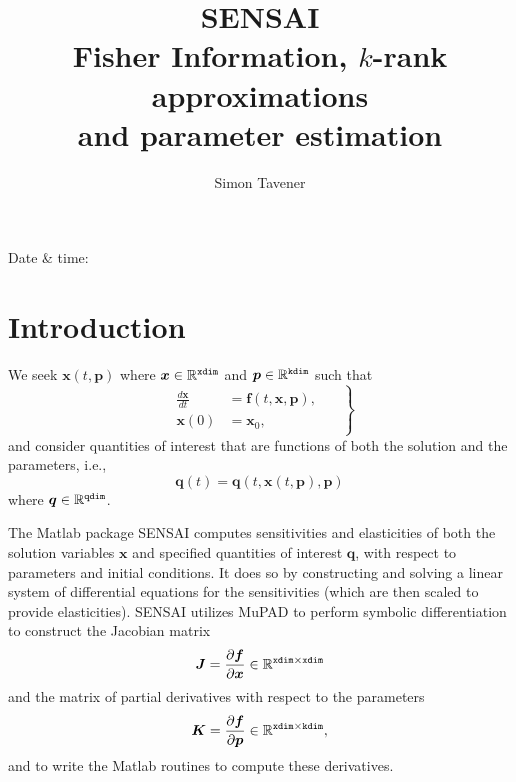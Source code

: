 \documentclass{siamltex}
\newcommand{\fvec}{\bm{f}}
\newcommand{\pvec}{\bm{p}}
\newcommand{\qvec}{\bm{q}}
\newcommand{\xvec}{\bm{x}}
\newcommand{\Jmat}{\bm{J}}
\newcommand{\Kmat}{\bm{K}}
\newcommand{\reals}{\mathbb R}
\newcommand{\xdim}{{\tt xdim}}
\newcommand{\kdim}{{\tt kdim}}
\newcommand{\qdim}{{\tt qdim}}
\begin{document}
\title{SENSAI \\  Fisher Information,  $k$-rank approximations \\ and parameter estimation}
\author{Simon Tavener}
\maketitle
\hfill Date \& time: \timestamp
\pagestyle{empty}


\section{Introduction}

We seek $\xvec(t,\pvec)$ where $\xvec \in \reals^\xdim$ and $\pvec \in \reals^\kdim$ such that
\begin{equation}
\left .
\begin{gathered}\begin{aligned}
\frac{d\xvec}{dt} &= \fvec(t,\xvec,\pvec), \\
         \xvec(0) &= \xvec_0,
\end{aligned}\end{gathered}
\quad\right\}
\end{equation}
and consider quantities of interest that are functions of both the solution and the parameters, i.e.,
\begin{equation}
\qvec(t)=\qvec(t,\xvec(t,\pvec),\pvec)
\end{equation}
where $\qvec \in \reals^\qdim$.


The Matlab package SENSAI computes sensitivities and elasticities of both the solution variables $\xvec$ and specified quantities of interest $\qvec$, with respect to parameters and initial conditions. It does so by constructing and solving a linear system of differential equations for the sensitivities (which are then scaled to provide elasticities). SENSAI utilizes MuPAD to perform symbolic differentiation to construct the Jacobian matrix
\begin{equation}
\Jmat = \frac{\partial \fvec}{\partial \xvec} \in \reals^{\xdim \times \xdim}
\end{equation}
and the matrix of partial derivatives with respect to the parameters
\begin{equation}
\Kmat = \frac{\partial \fvec}{\partial \pvec} \in \reals^{\xdim \times \kdim},
\end{equation}
and to write the Matlab routines to compute these derivatives.
\end{document}
